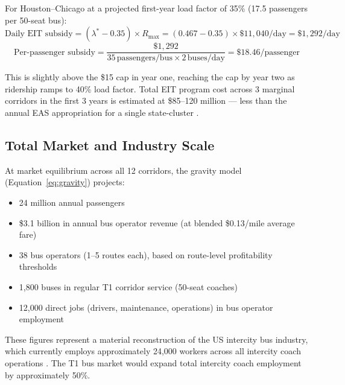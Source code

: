 For Houston--Chicago at a projected first-year load factor of 35\% (17.5 passengers per 50-seat bus):
\[
  \text{Daily EIT subsidy} = (\lambda^* - 0.35) \times R_{\text{max}} = (0.467 - 0.35) \times \$11{,}040/\text{day} = \$1{,}292/\text{day}
\]
\[
  \text{Per-passenger subsidy} = \frac{\$1{,}292}{35\,\text{passengers/bus} \times 2\,\text{buses/day}} = \$18.46/\text{passenger}
\]

This is slightly above the \$15 cap in year one, reaching the cap by year two as ridership ramps to 40\% load factor. Total EIT program cost across 3 marginal corridors in the first 3 years is estimated at \$85--120 million --- less than the annual EAS appropriation for a single state-cluster \citep{EAS_DOT2023}.

\subsection{Total Market and Industry Scale}

At market equilibrium across all 12 corridors, the gravity model (Equation~\ref{eq:gravity}) projects:
\begin{itemize}
  \item 24 million annual passengers
  \item \$3.1 billion in annual bus operator revenue (at blended \$0.13/mile average fare)
  \item 38 bus operators (1--5 routes each), based on route-level profitability thresholds
  \item 1,800 buses in regular T1 corridor service (50-seat coaches)
  \item 12,000 direct jobs (drivers, maintenance, operations) in bus operator employment
\end{itemize}

These figures represent a material reconstruction of the US intercity bus industry, which currently employs approximately 24,000 workers across all intercity coach operations \citep{BTS_intermodal2023}. The T1 bus market would expand total intercity coach employment by approximately 50\%.
